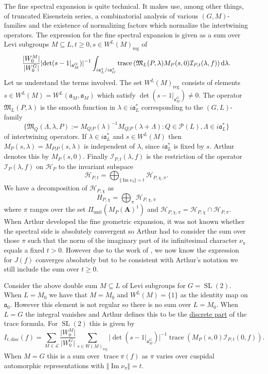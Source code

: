 \documentclass[11pt]{amsart}
\def\A{\mathbf A}
\def\HHH{\mathcal H}
\def\III{\mathcal I}
\def\LLL{\mathcal L}
\def\MMM{\mathfrak M}	%
\def\PPP{\mathcal P}
\def\aaa{\mathfrak a}
\def\cb#1{{\color{blue}#1}}
\def\d{\text d}
\def\det{\operatorname{det}}
\def\disc{\text{disc}}
\def\Im{\operatorname{Im}}
\def\mod#1{\lvert #1 \rvert} %
\def\norm#1{\Vert #1 \Vert} %
\def\reg{\operatorname{reg}}
\def\sl{\operatorname{SL}}
\def\trace{\operatorname{trace}}
\def\unit{\operatorname{unit}}
\theoremstyle{remark}
\begin{document}
The fine spectral expansion is quite technical. It makes use, among other things, of truncated Eisenstein series, a combinatorial analysis of various $(G, M)$-families and the existence of normalizing factors which normalize the intertwining operators. The expression for the fine spectral expansion is given as a sum over Levi subgroups $M \subseteq L, t \geq 0, s \in W^L(M)_{\reg}$ of 
\[ 
	\frac{\mod{W_0^M}}{\mod{W_0^G}} \mod{\det(s - 1|_{\aaa_M^G})}^{-1} 
		\int_{i\aaa_L^* / i\aaa_G^*} \trace \left( \MMM_L(P, \lambda) M_P(s, 0) \III_{P, t}(\lambda, f) \right) \d \lambda. 
\]
Let us understand the terms involved. The set $W^L(M)_{\reg}$ consists of elements $s \in W^L(M) = W^L(\aaa_M, \aaa_M)$ which satisfy $\det(s-1|_{\aaa_M^G}) \neq 0$. The operator $\MMM_L(P, \lambda)$ is the smooth function in $\lambda \in i\aaa_L^*$ corresponding to the $(G, L)$-family 
\[ \{ \MMM_Q(\Lambda, \lambda, P) := M_{Q|P}(\lambda)^{-1} M_{Q|P}(\lambda + \Lambda) : Q \in \PPP(L), \Lambda \in i\aaa_L^* \} \]
of intertwining operators. If $\lambda \in i\aaa_L^*$ and $s \in W^L(M)$ then $M_P(s, \lambda) = M_{P|P}(s, \lambda)$ is independent of $\lambda$, since $i\aaa_L^*$ is fixed by $s$. Arthur denotes this by $M_P(s, 0)$. Finally $\III_{P, t}(\lambda, f)$ is the restriction of the operator $\III_P(\lambda, f)$ on $\HHH_P$ to the invariant subspace 
\[ \HHH_{P, t} = \bigoplus_{\norm{\Im \nu_\pi} = t} \HHH_{P, \chi, \pi}. \]
We have a decomposition of $\HHH_{P, \chi}$ as
\[ H_{P, \chi} = \bigoplus_\pi \HHH_{P, \chi, \pi} \]
where $\pi$ ranges over the set $\Pi_{\unit}(M_P(\A)^1)$ and $\HHH_{P, \chi, \pi} = \HHH_{P, \chi} \cap \HHH_{P, \pi}$. When Arthur developed the fine geometric expansion, it was not known whether the spectral side is absolutely convergent so Arthur had to consider the sum over those $\pi$ such that the norm of the imaginary part of its infinitesimal character $\nu_\pi$ equals a fixed $t > 0$. However due to the work of \cite{FLM}, we now know the expression for $J(f)$ converges absolutely but to be consistent with Arthur's notation we still include the sum over $t \geq 0$. 

\cb{Consider the above double sum $M\subseteq L$ of Levi subgroups for $G = \sl(2)$. When $L = M_0$ we have that $M=M_0$ and $W^L(M) = \{1\}$ as the identity map on $\aaa_0$. However this element is not regular so there is no sum over $L=M_0$. When $L=G$ the integral vanishes and Arthur defines this to be the \underline{discrete part} of the trace formula. For $\sl(2)$ this is given by
\[ I_{t, \disc}(f) = \sum_{M \in \LLL} \frac{\mod{W_0^M}}{\mod{W_0^G}} \sum_{s \in W(M)_{\reg}} \mod{\det(s-1|_{\aaa_M^G})}^{-1} \trace\left(M_P(s, 0) \III_{P, t}(0, f) \right). \]
When $M=G$ this is a sum over $\trace \pi(f)$ as $\pi$ varies over cuspidal automorphic representations with $\norm{\Im \nu_\pi} = t$. 
}
\end{document}
